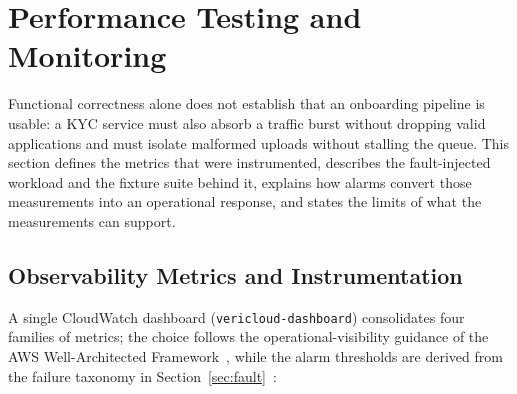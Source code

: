 %
%

\section{Performance Testing and Monitoring}\label{sec:testing}

Functional correctness alone does not establish that an onboarding pipeline is
usable: a KYC service must also absorb a traffic burst without dropping valid
applications and must isolate malformed uploads without stalling the queue. This
section defines the metrics that were instrumented, describes the fault-injected
workload and the fixture suite behind it, explains how alarms convert those
measurements into an operational response, and states the limits of what the
measurements can support.

\subsection{Observability Metrics and Instrumentation}\label{sec:metrics}

A single CloudWatch dashboard (\texttt{vericloud-dashboard}) consolidates four
families of metrics; the choice follows the operational-visibility guidance of
the AWS Well-Architected Framework~\cite{aws2023security}, while the alarm
thresholds are derived from the failure taxonomy in
Section~\ref{sec:fault}~\cite{aws2024cloudwatch}:

